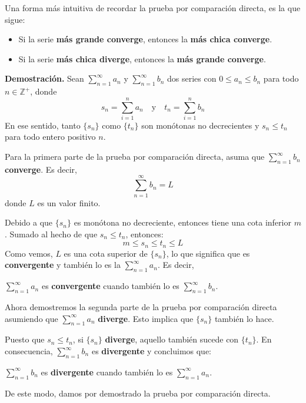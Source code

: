 \documentclass[12pt]{article}
\begin{document}
Una forma más intuitiva de recordar la prueba por comparación directa, es la que sigue:

\begin{itemize}
\item Si la serie \textbf{más grande converge}, entonces la \textbf{más chica converge}.
\item Si la serie \textbf{más chica diverge}, entonces la \textbf{más grande converge}.
\end{itemize}

\textbf{Demostración.} Sean $\sum_{n = 1}^{\infty} a_{n}$ y $\sum_{n = 1}^{\infty} b_{n}$ dos series con $0 \leq a_{n} \leq b_{n}$ para todo $n \in \mathbb{Z}^{+}$, donde
\[
  s_{n} = \sum_{i = 1}^{n} a_{n} \quad \text{y} \quad t_{n} = \sum_{i = 1}^{n} b_{n}
\]
En ese sentido, tanto $\{s_{n}\}$ como $\{t_{n}\}$ son monótonas no decrecientes y $s_{n} \leq t_{n}$ para todo entero positivo $n$.

Para la primera parte de la prueba por comparación directa, asuma que $\sum_{n = 1}^{\infty} b_{n}$ \textbf{converge}. Es decir,
\[
  \sum_{n = 1}^{\infty} b_{n} = L
\]
donde $L$ es un valor finito.

Debido a que $\{s_{n}\}$ es monótona no decreciente, entonces tiene una cota inferior $m$. Sumado al hecho de que $s_{n} \leq t_{n}$, entonces:
\[
  m \leq s_{n} \leq t_{n} \leq L
\]
Como vemos, $L$ es una cota superior de $\{s_{n}\}$, lo que significa que es \textbf{convergente} y también lo es la $\sum_{n = 1}^{\infty} a_{n}$. Es decir,

\begin{center}
$\sum_{n = 1}^{\infty} a_{n}$ es \textbf{convergente} cuando también lo es $\sum_{n = 1}^{\infty} b_{n}$.
\end{center}

Ahora demostremos la segunda parte de la prueba por comparación directa asumiendo que $\sum_{n = 1}^{\infty} a_{n}$ \textbf{diverge}. Esto implica que $\{s_{n}\}$ también lo hace.

Puesto que $s_{n} \leq t_{n}$, si $\{s_{n}\}$ \textbf{diverge}, aquello también sucede con $\{t_{n}\}$. En consecuencia, $\sum_{n = 1}^{\infty} b_{n}$ es \textbf{divergente} y concluimos que:

\begin{center}
$\sum_{n = 1}^{\infty} b_{n}$ es \textbf{divergente} cuando también lo es $\sum_{n = 1}^{\infty} a_{n}$.
\end{center}

De este modo, damos por demostrado la prueba por comparación directa.
\end{document}
